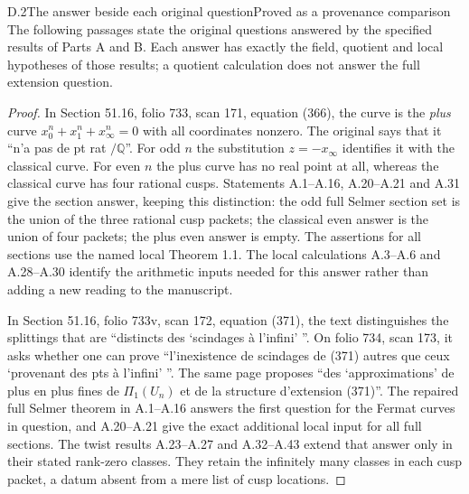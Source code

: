 \begin{statement}{D.2}{The answer beside each original question}{Proved as a provenance comparison}
The following passages state the original questions answered by the
specified results of Parts A and B. Each answer has exactly the field,
quotient and local hypotheses of those results; a quotient calculation
does not answer the full extension question.
\end{statement}
\begin{proof}
In Section 51.16, folio 733, scan 171, equation (366), the curve is the
\emph{plus} curve $x_0^n+x_1^n+x_\infty^n=0$ with all coordinates nonzero.
The original says that it ``n'a pas de pt rat $/\mathbb Q$''.
For odd $n$ the substitution $z=-x_\infty$ identifies it with the
classical curve. For even $n$ the plus curve has no real point at all,
whereas the classical curve has four rational cusps. Statements A.1--A.16,
A.20--A.21 and A.31 give the section answer, keeping this distinction:
the odd full Selmer section set is the union of the three rational cusp
packets; the classical even answer is the union of four packets; the plus
even answer is empty. The assertions for all sections use the named local
Theorem 1.1. The local calculations A.3--A.6 and A.28--A.30 identify the
arithmetic inputs needed for this answer rather than adding a new reading
to the manuscript.

In Section 51.16, folio 733v, scan 172, equation (371), the text distinguishes
the splittings that are ``distincts des `scindages \`a l'infini' ''.
On folio 734, scan 173, it asks whether one can prove
``l'inexistence de scindages de (371) autres que ceux `provenant des pts
\`a l'infini' ''. The same page proposes ``des `approximations' de plus
en plus fines de $\Pi_1(U_n)$ et de la structure d'extension (371)''.
The repaired full Selmer theorem in A.1--A.16 answers the first question
for the Fermat curves in question, and A.20--A.21 give the exact additional
local input for all full sections. The twist results A.23--A.27 and A.32--A.43
extend that answer only in their stated rank-zero classes. They retain
the infinitely many classes in each cusp packet, a datum absent from a
mere list of cusp locations.


\end{proof}
